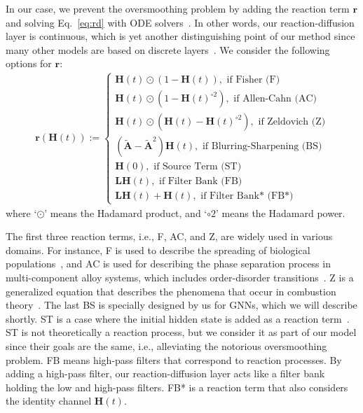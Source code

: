 \documentclass{article}
\theoremstyle{plain}
\theoremstyle{definition}
\theoremstyle{remark}
\begin{document}
In our case, we prevent the oversmoothing problem by adding the reaction term $\mathbf{r}$ and solving Eq.~\eqref{eq:rd} with ODE solvers~\cite{dormand1980dopri}. In other words, our reaction-diffusion layer is continuous, which is yet another distinguishing point of our method since many other models are based on discrete layers~\cite{kipf2017GCN,Bo2021fagcn,chien2021GPRGNN,zhu2020h2gcn,hamilton2017graphSAGE}. We consider the following options for $\mathbf{r}$:
\begingroup\makeatletter\def\f@size{9}\check@mathfonts
\def\maketag@@@#1{\hbox{\m@th\small\normalfont#1}}\begin{align}\label{eq:reac}
    \mathbf{r}(\mathbf{H}(t)) := \begin{cases} \mathbf{H}(t)\odot(1-\mathbf{H}(t)),\textrm{ if Fisher (F)}\\
    \mathbf{H}(t)\odot(1-\mathbf{H}(t)^{\circ 2}),\textrm{ if Allen-Cahn (AC)}\\
    \mathbf{H}(t)\odot(\mathbf{H}(t)-\mathbf{H}(t)^{\circ 2}),\textrm{ if Zeldovich (Z)}\\
    (\tilde{\mathbf{A}}-\tilde{\mathbf{A}}^2)\mathbf{H}(t),\textrm{ if Blurring-Sharpening (BS)}\\
    \mathbf{H}(0), \textrm{ if Source Term (ST)} \\
    \mathbf{L}\mathbf{H}(t), \textrm{ if Filter Bank (FB)} \\
    \mathbf{L}\mathbf{H}(t)+\mathbf{H}(t), \textrm{ if Filter Bank* (FB*)}
    \end{cases}
\end{align}\endgroup where `$\odot$' means the Hadamard product, and `$\circ 2$' means the Hadamard power.

The first three reaction terms, i.e., F, AC, and Z, are widely used in various domains. For instance, F is used to describe the spreading of biological populations~\cite{fisher1937wave}, and AC is used for describing the phase separation process in multi-component alloy systems, which includes order-disorder transitions~\cite{allen1979microscopic}. Z is a generalized equation that describes the phenomena that occur in combustion theory~\cite{gilding2004travelling}. The last BS is specially designed by us for GNNs, which we will describe shortly. ST is a case where the initial hidden state is added as a reaction term~\cite{xhonneux2019CGNN}. ST is not theoretically a reaction process, but we consider it as part of our model since their goals are the same, i.e., alleviating the notorious oversmoothing problem. FB means high-pass filters that correspond to reaction processes. By adding a high-pass filter, our reaction-diffusion layer acts like a filter bank holding the low and high-pass filters. FB* is a reaction term that also considers the identity channel $\mathbf{H}(t)$. 
\end{document}
